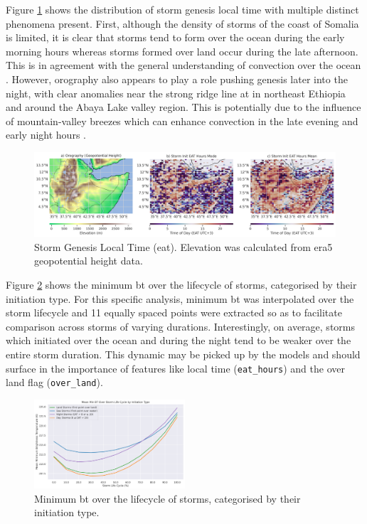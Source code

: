 Figure \ref{fig:orography_storm_init_eat_hours_mode_mean} shows the distribution of storm genesis local time with multiple distinct phenomena present. First, although the density of storms of the coast of Somalia is limited, it is clear that storms tend to form over the ocean during the early morning hours whereas storms formed over land occur during the late afternoon. This is in agreement with the general understanding of convection over the ocean \citep{Hall1999,Houze2004}. However, orography also appears to play a role pushing genesis later into the night, with clear anomalies near the strong ridge line at  in northeast Ethiopia and around the Abaya Lake valley region. This is potentially due to the influence of mountain-valley breezes which can enhance convection in the late evening and early night hours \citep{Zardi2013}.

\begin{figure}[ht]
    \centering
    \includegraphics[width=\textwidth]{../figures/generated/exploration/orography_storm_init_eat_hours_mode_mean.png}
    \caption{Storm Genesis Local Time (\acrlong{eat}). Elevation was calculated from \acrshort{era5} geopotential height data.}
    \label{fig:orography_storm_init_eat_hours_mode_mean}
\end{figure}

Figure \ref{fig:min_bt_over_lifecycle_by_init_type} shows the minimum \acrshort{bt} over the lifecycle of storms, categorised by their initiation type. For this specific analysis, minimum \acrshort{bt} was interpolated over the storm lifecycle and 11 equally spaced points were extracted so as to facilitate comparison across storms of varying durations. Interestingly, on average, storms which initiated over the ocean and during the night tend to be weaker over the entire storm duration. This dynamic may be picked up by the models and should surface in the importance of features like local time (\texttt{eat\_hours}) and the over land flag (\texttt{over\_land}). 

\begin{figure}[ht]
    \centering
    \includegraphics[width=0.5\textwidth]{../figures/generated/exploration/min_bt_over_lifecycle_by_init_type.png}
    \caption{Minimum \acrfull{bt} over the lifecycle of storms, categorised by their initiation type.}
    \label{fig:min_bt_over_lifecycle_by_init_type}
\end{figure}

